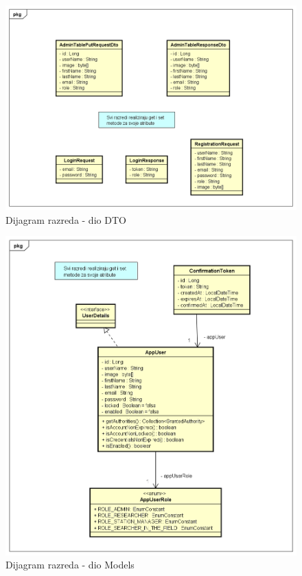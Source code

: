 			\begin{figure}[H]
				\includegraphics[scale=0.5]{dijagrami/DTO.png} 
				\centering
				\caption{Dijagram razreda - dio DTO}
				\label{fig:promjene}
			\end{figure}
			
			\begin{figure}[H]
				\includegraphics[scale=0.5]{dijagrami/Model.png} 
				\centering
				\caption{Dijagram razreda - dio Models}
				\label{fig:promjene}
			\end{figure}
			
